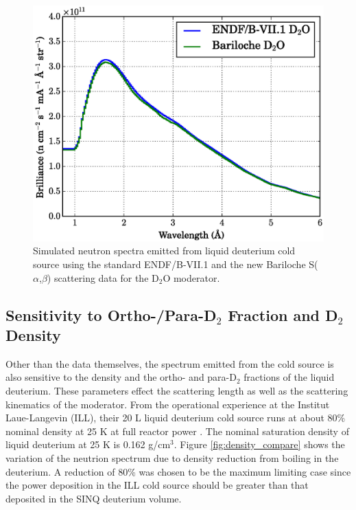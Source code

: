 \documentclass[5p,12pt]{elsarticle}
\begin{document}
\begin{figure}[h!] 
  \centering
    \includegraphics[width=\columnwidth]{graphics/data_compare_d2o.eps}
     \caption{Simulated neutron spectra emitted from liquid deuterium cold source using the standard ENDF/B-VII.1 and the new Bariloche S($\alpha$,$\beta$) scattering data for the D$_2$O moderator.   \label{fig:data_compare_d2o}}
\end{figure}

%
%
%
%
%

\subsection{Sensitivity to Ortho-/Para-D$_2$ Fraction and D$_2$ Density}
\label{subsec:frac_den}

Other than the data themselves, the spectrum emitted from the cold source is also sensitive to the density and the ortho- and para-D$_2$ fractions of the liquid deuterium.  These parameters effect the scattering length as well as the scattering kinematics of the moderator.  From the operational experience at the Institut Laue-Langevin (ILL), their 20 L liquid deuterium cold source runs at about 80\% nominal density at 25 K at full reactor power \cite{ill_cns}. The nominal saturation density of liquid deuterium at 25 K is 0.162 g/cm$^3$\cite{bnl_cryo}.  Figure \ref{fig:density_compare} shows the variation of the neutrion spectrum due to density reduction from boiling in the deuterium.  A reduction of 80\% was chosen to be the maximum limiting case since the power deposition in the ILL cold source should be greater than that deposited in the SINQ deuterium volume.
\end{document}
